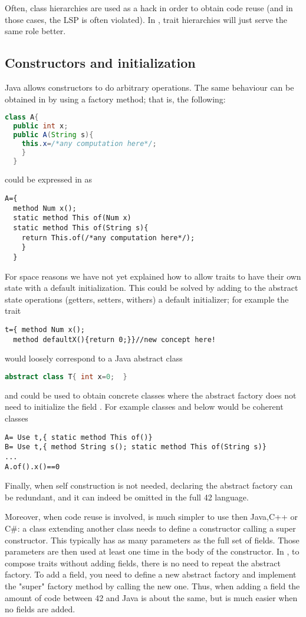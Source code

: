 Often, class hierarchies are used as a hack in order to obtain code reuse (and in those cases, the LSP is often violated).
In \name, trait hierarchies will just serve the same role better.


\subsection{Constructors and initialization}
Java allows constructors to do arbitrary operations.
The same behaviour can be obtained in \name by using a factory method; that is, the following:
\begin{lstlisting}[language=Java]
class A{
  public int x;
  public A(String s){
    this.x=/*any computation here*/;
    }
  }
\end{lstlisting}
could be expressed in \name as 
\begin{lstlisting}
A={
  method Num x();
  static method This of(Num x)
  static method This of(String s){
    return This.of(/*any computation here*/);
    }
  }
\end{lstlisting}

For space reasons we have not yet explained how to allow traits to have their own state with a default initialization.
This could be solved by adding to the abstract state operations (getters, setters, withers) a default initializer;
for example the trait
\begin{lstlisting}
t={ method Num x();
  method defaultX(){return 0;}}//new concept here!
\end{lstlisting}
would loosely correspond to a Java abstract class
\begin{lstlisting}[language=Java]
abstract class T{ int x=0;  }
\end{lstlisting}
and could be used to obtain concrete classes where the abstract factory does not need to initialize the field \Q@x@.
For example classes \Q@A@ and \Q@B@ below would be coherent classes
\begin{lstlisting}
A= Use t,{ static method This of()}
B= Use t,{ method String s(); static method This of(String s)}
...
A.of().x()==0
\end{lstlisting}

Finally, when self construction is not needed, declaring the abstract factory can be redundant, and it can indeed be omitted in the full 42 language.

Moreover, when code reuse is involved, \name is much simpler to use then Java,C++ or C\#: a class extending another class needs to define a constructor calling a super constructor.
   This typically has as many parameters as the full set of fields. Those parameters are then used at least one time in the body of the constructor.
In \name, to compose traits without adding fields, there is no need to repeat the abstract factory.
To add a field, you need to define a new abstract factory and implement the "super" factory method by calling the new one.
Thus, when adding a field the amount of code between 42 and Java is about the same, but is much easier when no fields are added.

